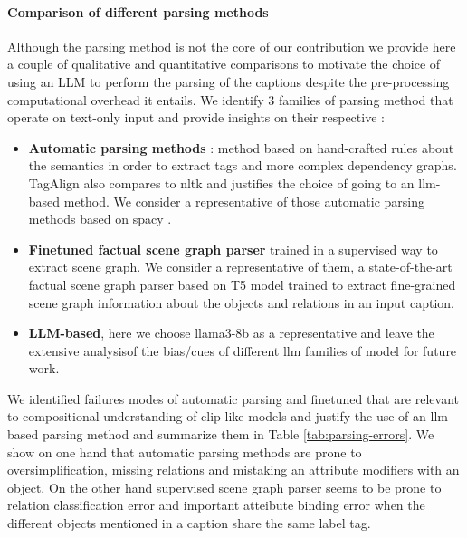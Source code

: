 {\paragraph{Comparison of different parsing methods} Although the parsing method is not the core of our contribution we provide here a couple of qualitative and quantitative comparisons to motivate the choice of using an LLM to perform the parsing of the captions despite the pre-processing computational overhead it entails. We identify 3 families of parsing method that operate on text-only input and provide insights on their respective : 
\begin{itemize}
    \item \textbf{Automatic parsing methods} : method based on hand-crafted rules about the semantics in order to extract tags and more complex dependency graphs. TagAlign also compares to nltk and justifies the choice of going to an llm-based method. We consider a representative of those automatic parsing methods based on spacy \citep{spacy2}.
    \item \textbf{Finetuned factual scene graph parser} trained in a supervised way to extract scene graph. We consider a representative of them, a state-of-the-art factual scene graph parser based on T5 model \citep{li2023factualbenchmarkfaithfulconsistent} trained to extract fine-grained scene graph information about the objects and relations in an input caption.
    \item \textbf{LLM-based}, here we choose llama3-8b as a representative and leave the extensive analysisof the bias/cues of different llm families of model for future work.
\end{itemize}
We identified failures modes of automatic parsing and finetuned that are relevant to compositional understanding of clip-like models and justify the use of an llm-based parsing method and summarize them in Table \ref{tab:parsing-errors}. We show on one hand that automatic parsing methods are prone to oversimplification, missing relations and mistaking an attribute modifiers with an object. On the other hand supervised scene graph parser seems to be prone to relation classification error and important atteibute binding error when the different objects mentioned in a caption share the same label tag.


}
